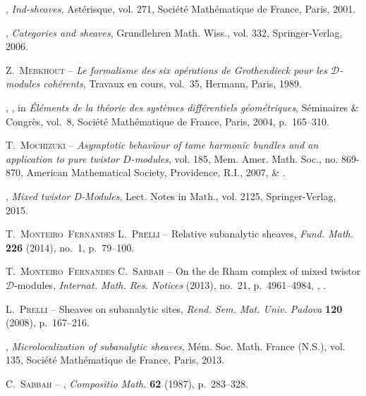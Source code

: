 \documentclass[english]{smfart}
\numberwithin{subsection}{section}
\numberwithin{equation}{section}
\theoremstyle{plain}
\theoremstyle{definition}
\begin{document}
\begin{thebibliography}{10}
\bysame , \emph{Ind-sheaves}, Ast{\'e}risque, vol. 271, Soci{\'e}t{\'e}
  Math{\'e}matique de France, Paris, 2001.

\bysame , \emph{{Categories and sheaves}}, Grundlehren Math. Wiss., vol. 332,
  Springer-Verlag, 2006.

{\scshape Z.~Mebkhout} -- \emph{{Le formalisme des six op{\'e}rations de
  Grothendieck pour les {$\mathcal{D}$}-modules coh{\'e}rents}}, Travaux en
  cours, vol.~35, Hermann, Paris, 1989.

\bysame , {\fg}, in
  \emph{{Él{\'e}ments de la th{\'e}orie des syst{\`e}mes diff{\'e}rentiels
  g{\'e}o\-m{\'e}\-triques}}, S{\'e}minaires \& Congr{\`e}s, vol.~8,
  Soci{\'e}t{\'e} Math{\'e}matique de France, Paris, 2004, p.~165--310.

{\scshape T.~Mochizuki} -- \emph{{Asymptotic behaviour of tame harmonic bundles
  and an application to pure twistor $D$-modules}}, vol. 185, Mem. Amer. Math.
  Soc., no. 869-870, American Mathematical Society, Providence, R.I., 2007,
   \& .

\bysame , \emph{{Mixed twistor D-Modules}}, Lect. Notes in Math., vol. 2125,
  Springer-Verlag, 2015.

{\scshape T.~Monteiro~Fernandes {\normalfont \smfandname} L.~Prelli} -- {\og
  Relative subanalytic sheaves\fg}, \emph{Fund. Math.} \textbf{226} (2014),
  no.~1, p.~79--100.

{\scshape T.~Monteiro~Fernandes {\normalfont \smfandname} C.~Sabbah} -- {\og
  {On the de Rham complex of mixed twistor $\mathcal{D}$-modules}\fg},
  \emph{Internat. Math. Res. Notices} (2013), no.~21, p.~4961--4984,
  , .

{\scshape L.~Prelli} -- {\og Sheaves on subanalytic sites\fg}, \emph{Rend. Sem.
  Mat. Univ. Padova} \textbf{120} (2008), p.~167--216.

\bysame , \emph{Microlocalization of subanalytic sheaves}, M{\'e}m. Soc. Math.
  France (N.S.), vol. 135, Soci{\'e}t{\'e} Math{\'e}matique de France, Paris,
  2013.

{\scshape C.~Sabbah} -- {\fg}, \emph{Compositio Math.} \textbf{62} (1987), p.~283--328.


\end{thebibliography}
\end{document}
